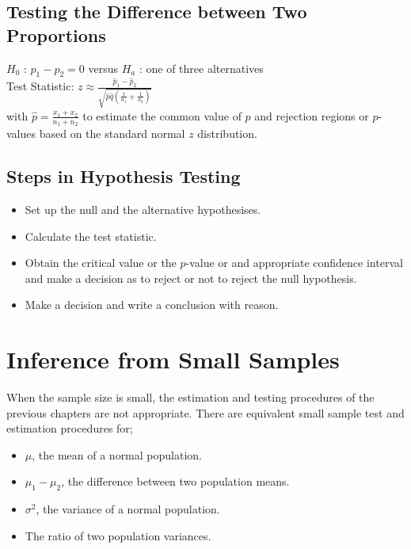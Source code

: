 \documentclass[12pt, letterpaper]{article}
\begin{document}
        \subsection{Testing the Difference between Two Proportions}
            \begin{mdframed}[leftmargin=0.5cm, rightmargin=0.5cm]
                \begin{flushleft}
                    $H_0$ : $p_1 - p_2 = 0$ versus $H_a$ : one of three alternatives \\ 
                    Test Statistic: $z \approx {\frac{\hat{p}_1 - \hat{p}_2}{\sqrt{\hat{p}\hat{q}\left(\frac{1}{n_1}+\frac{1}{n_2}\right)}}}$ \\
                    with $\hat{p} = \frac{x_1 + x_2}{n_1 + n_2}$ to estimate the common value of $p$ and rejection regions or $p$-values based on the standard normal $z$ distribution.
                \end{flushleft}
            \end{mdframed}
        \subsection{Steps in Hypothesis Testing}
            \begin{itemize}
                \item Set up the null and the alternative hypothesises.
                \item Calculate the test statistic.
                \item Obtain the critical value or the $p$-value or and appropriate confidence interval and make a decision as to reject or not to reject the null hypothesis.
                \item Make a decision and write a conclusion with reason.
            \end{itemize}
    \section{Inference from Small Samples}
        When the sample size is small, the estimation and testing procedures of the previous chapters are not appropriate. There are equivalent small sample test and estimation procedures for;
        \begin{itemize}
            \item $\mu$, the mean of a normal population.
            \item $\mu_1 - \mu_2$, the difference between two population means.
            \item $\sigma^2$, the variance of a normal population.
            \item The ratio of two population variances.
        \end{itemize}
\end{document}
